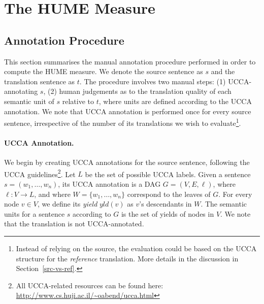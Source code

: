 \documentclass[11pt]{article}
\newcommand{\secref}[1]{Section~\ref{#1}}
\begin{document}


\section{The HUME Measure}\label{sec:hume}


\subsection{Annotation Procedure}\label{sec:guidelines}

This section summarises the manual annotation procedure performed in order 
to compute the HUME measure. 
We denote the source sentence as $s$ and the translation sentence as $t$. 
The procedure involves two manual steps: (1) UCCA-annotating $s$, 
(2) human judgements as to the translation quality of each semantic unit of $s$ relative to $t$,
where units are defined according to the UCCA annotation.
We note that UCCA annotation is performed once for every source sentence,
irrespective of the number of its translations we wish
to evaluate\footnote{Instead of relying on the source,
the evaluation could be based on the UCCA structure for the \emph{reference}
translation.
More details in the discussion in \secref{src-vs-ref}.
}.

\paragraph{UCCA Annotation.}
We begin by creating UCCA annotations for the source sentence, following the
UCCA guidelines\footnote{All UCCA-related resources can be found
  here: \url{http://www.cs.huji.ac.il/~oabend/ucca.html}}.
Let $L$ be the set of possible UCCA labels.
Given a sentence $s = (w_1, \ldots,w_n)$, its UCCA annotation is a DAG $G=(V,E,\ell)$,
where $\ell: V \rightarrow L$, and where $W = \{w_1,\ldots,w_n\}$ correspond to the leaves of $G$.
For every node $v \in V$, we define its {\it yield} $yld(v)$ as $v$'s descendants in $W$.
The semantic units for a sentence $s$ according to $G$
is the set of yields of nodes in $V$. 
We note that the translation is not UCCA-annotated.
\end{document}
